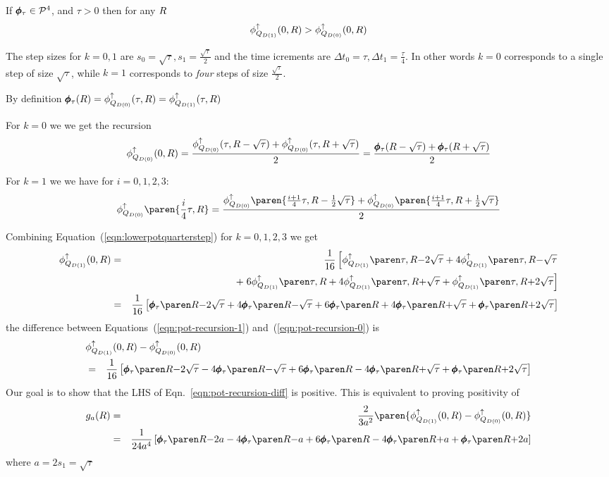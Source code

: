\documentclass{article}[12pt]
\begin{document}
\begin{lemma} \label{lemma:half-step}
  If $ \pmb{\phi}_{\tau} \in {\cal P}^{4}$, and $\tau>0$ then for any $R$
  $$\phi_{Q_{D(1)}}^{\uparrow}(0,R) >  \phi_{Q_{D(0)}}^{\uparrow}(0,R)$$
\end{lemma}
  
\proof The step sizes for $k=0,1$ are
$s_0=\sqrt{\tau}, s_1=\frac{\sqrt{\tau}}{2}$ and the time icrements
are $\Delta t_0=\tau, \Delta t_1=\frac{\tau}{4}$. 
In other words $k=0$ corresponds to a single step of size $\sqrt{\tau}$, while $k=1$ corresponds
to {\em four} steps of size $\frac{\sqrt{\tau}}{2}$.

By definition $\pmb{\phi}_{\tau}(R)=\phi_{Q_{D(0)}}^{\uparrow}(\tau,R)=\phi_{Q_{D(1)}}^{\uparrow}(\tau,R)$

For $k=0$ we we get the recursion
\begin{equation}  \label{eqn:pot-recursion-0}
  \phi_{Q_{D(0)}}^{\uparrow}(0, R) =
  \frac{\phi_{Q_{D(0)}}^{\uparrow}(\tau,R-\sqrt{\tau})+
    \phi_{Q_{D(0)}}^{\uparrow}(\tau,R+\sqrt{\tau})}{2}
  =   \frac{\pmb{\phi}_{\tau}(R-\sqrt{\tau})+
    \pmb{\phi}_{\tau}(R+\sqrt{\tau})}{2}
\end{equation}

For $k=1$ we we have for $i=0,1,2,3$:
\begin{equation}   \label{eqn:lowerpotquarterstep}
   \lowerpotMdkpar{0}\paren{\frac{i}{4}\tau,\R}=
 \frac{\lowerpotMdkpar{0}\paren{\frac{i+1}{4}\tau,\R-\frac{1}{2}\sqrt{\tau}}+
   \lowerpotMdkpar{0}\paren{\frac{i+1}{4}\tau,\R+\frac{1}{2}\sqrt{\tau}}}{2}
 \end{equation}


Combining Equation~(\ref{eqn:lowerpotquarterstep}) for $k=0,1,2,3$ we get
\small
\begin{eqnarray} \label{eqn:pot-recursion-1}
  \lowerpotMdkpar{1}(0, \R)
  &=& \frac{1}{16}
      \left[\iter{-2}+4\iter{-} \right. \\
  &&+ \left. 6\iterzero +4\iter{+}+\iter{+2}\right] \nonumber\\
  &=& \frac{1}{16}
      \left[\fIter{-2}+4\fIter{-}+6\fIterzero +4\fIter{+}+\fIter{+2}\right] \nonumber
\end{eqnarray}
\normalsize the difference between
Equations~(\ref{eqn:pot-recursion-1}) and~(\ref{eqn:pot-recursion-0})
is \small
\begin{eqnarray} \label{eqn:pot-recursion-diff}
  \lefteqn{\lowerpotMdkpar{1}(0, \R) - \lowerpotMdkpar{0}(0, \R)}\\
&=&  \frac{1}{16}
\left[\fIter{-2}-4\fIter{-}+6\fIterzero -4\fIter{+}+\fIter{+2}\right] \nonumber
\end{eqnarray}
\normalsize Our goal is to show that the LHS of
Eqn.~\ref{eqn:pot-recursion-diff} is positive. This is equivalent to
proving positivity of
\begin{eqnarray}
g_a(\R) &=& \frac{2}{3a^2}\paren{\lowerpotMdkpar{1}(0, \R) -
  \lowerpotMdkpar{0}(0, \R)}\nonumber \\
& = &
\frac{1}{24 a^4}
      \left[\gIter{-2}-4\gIter{-}+6\gIterzero -4\gIter{+}+\gIter{+2}\right]
       \label{eqn:recursion-as-difference}
\end{eqnarray}
where $a=2 s_1=\sqrt{\tau}$
\end{document}

